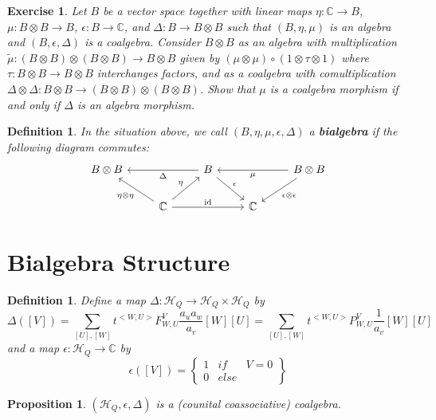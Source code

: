 \documentclass{book}
\newtheorem{prop}[theorem]{Proposition}
\newtheorem{definition}[theorem]{Definition}
\newtheorem {exercise}[theorem] {Exercise}
\newcommand{\id}{\mathrm{id}}
\begin{document}
        \begin{exercise}
            Let $B$ be a vector space together with linear maps $\eta:\mathbb{C}\to B$, $\mu:B\otimes B\to B$, $\epsilon:B\to\mathbb{C}$, and $\Delta:B\to B\otimes B$ such that $(B,\eta,\mu)$ is an algebra and $(B,\epsilon,\Delta)$ is a coalgebra. Consider $B\otimes B$ as an algebra with multiplication $\tilde{\mu}:(B\otimes B)\otimes (B\otimes B)\to B\otimes B $ given by $(\mu\otimes \mu)\circ(1 \otimes \tau\otimes 1)$ where $\tau:B\otimes B\to B\otimes B$ interchanges factors, and as a coalgebra with comultiplication $\Delta\otimes\Delta:B\otimes B \to (B\otimes B)\otimes(B\otimes B)$. Show that $\mu$ is a coalgebra morphism if and only if $\Delta$ is an algebra morphism. 
        \end{exercise}
        
        \begin{definition}
            In the situation above, we call $(B,\eta,\mu,\epsilon,\Delta)$ a \textbf{bialgebra} if the following diagram commutes:
            \[\begin{tikzcd}
            B\otimes B && \arrow{ll}{\Delta}B\arrow{dr}{\epsilon} && B\otimes B \arrow{ll}{\mu}\arrow{dl}{\epsilon\otimes\epsilon} \\
            & \mathbb{C}\arrow{ul}{\eta\otimes\eta}\arrow{ur}{\eta}\arrow{rr}{\id} && \mathbb{C} &
            \end{tikzcd}\]
        \end{definition}

\section{Bialgebra Structure}

\begin{definition} Define a map $\Delta : \mathcal{H}_Q \rightarrow \mathcal{H}_Q \times \mathcal{H}_Q$ by $$\Delta([V])=\sum_{[U],[W]} t^{<W,U>} F^V_{W,U} \frac{a_u a_w}{a_v} [W][U]=\sum_{[U],[W]} t^{<W,U>} P^V_{W,U} \frac{1}{a_v} [W][U]$$ and a map $\epsilon : \mathcal{H}_Q \rightarrow \mathbb{C}$ by $$\epsilon ([V]) =   \begin{Bmatrix} 1 & if & V=0 \\ 0 & else & \end{Bmatrix} $$
\end{definition}

\begin{prop}
$(\mathcal{H}_Q, \epsilon, \Delta)$ is a (counital coassociative) coalgebra. 
\end{prop}
\end{document}
